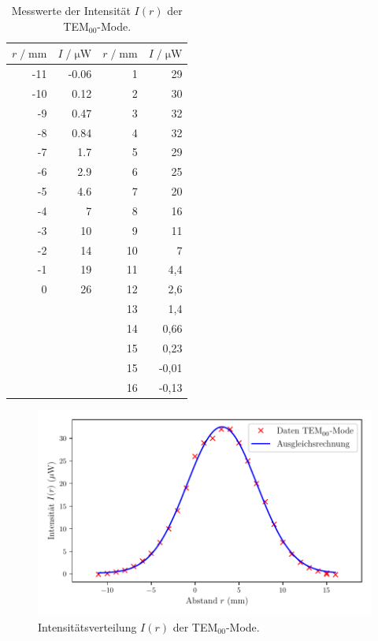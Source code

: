 \begin{table}[H]
  \centering
  \footnotesize
  \caption{Messwerte der Intensität $I(r)$ der TEM$_{00}$-Mode.}
  \label{tab:TEM00}
  \begin{tabular}{r r | r r}
  \toprule
  $r \;/\; \si{\milli\meter}$ & $I \;/\; \si{\micro\watt}$ & $r \;/\; \si{\milli\meter}$ & $I \;/\; \si{\micro\watt}$\\
  \midrule
-11 & -0.06   &  1   &  29   \\
-10 & 0.12    &  2   &  30   \\
-9  & 0.47    &  3   &  32   \\
-8  &  0.84   &  4   &  32   \\
-7  &  1.7    &  5   &  29   \\
-6  &  2.9    & 6   &  25   \\
-5  &  4.6    &  7   &  20   \\
-4  &  7      &  8   &  16   \\
-3  &  10     &  9   &  11   \\
-2  &  14     &  10  &  7    \\
-1  &  19     &  11  &  4,4    \\
0   &  26     &  12  &  2,6    \\
    &         &  13  &  1,4    \\
    &         &  14  &  0,66   \\
    &         &  15  &  0,23   \\
    &         &  15  &  -0,01    \\
    &         &  16  &  -0,13    \\
  \bottomrule
  \end{tabular}
\end{table}

\begin{figure}[H]
  \centering
  \includegraphics[scale=0.65]{TEM00.pdf}
  \vspace{-10pt}
  \caption{Intensitätsverteilung $I(r)$ der TEM$_{00}$-Mode.}
  \label{fig:TEM00}
\end{figure}


